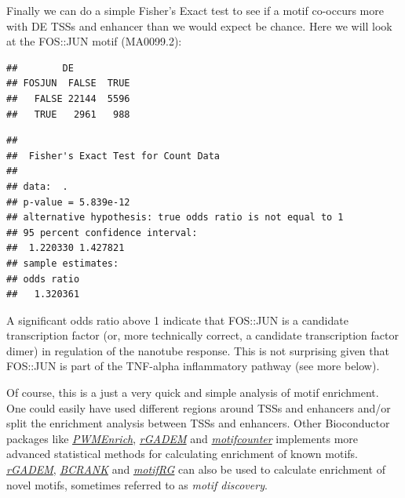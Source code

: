 \documentclass[9pt,a4paper,]{extarticle}
\newenvironment{Shaded}{\begin{snugshade}}{\end{snugshade}}
\newcommand{\KeywordTok}[1]{\textcolor[rgb]{0.13,0.29,0.53}{\textbf{{#1}}}}
\newcommand{\DataTypeTok}[1]{\textcolor[rgb]{0.13,0.29,0.53}{{#1}}}
\newcommand{\FloatTok}[1]{\textcolor[rgb]{0.00,0.00,0.81}{{#1}}}
\newcommand{\StringTok}[1]{\textcolor[rgb]{0.31,0.60,0.02}{{#1}}}
\newcommand{\CommentTok}[1]{\textcolor[rgb]{0.56,0.35,0.01}{\textit{{#1}}}}
\newcommand{\NormalTok}[1]{{#1}}
\begin{document}
Finally we can do a simple Fisher's Exact test to see if a motif co-occurs more with DE TSSs and enhancer than we would expect be chance. Here we will look at the FOS::JUN motif (MA0099.2):

\begin{Shaded}
\end{Shaded}

\begin{verbatim}
##        DE
## FOSJUN  FALSE  TRUE
##   FALSE 22144  5596
##   TRUE   2961   988
\end{verbatim}

\begin{verbatim}
## 
##  Fisher's Exact Test for Count Data
## 
## data:  .
## p-value = 5.839e-12
## alternative hypothesis: true odds ratio is not equal to 1
## 95 percent confidence interval:
##  1.220330 1.427821
## sample estimates:
## odds ratio 
##   1.320361
\end{verbatim}

A significant odds ratio above 1 indicate that FOS::JUN is a candidate transcription factor (or, more technically correct, a candidate transcription factor dimer) in regulation of the nanotube response. This is not surprising given that FOS::JUN is part of the TNF-alpha inflammatory pathway (see more below).

Of course, this is a just a very quick and simple analysis of motif enrichment. One could easily have used different regions around TSSs and enhancers and/or split the enrichment analysis between TSSs and enhancers. Other Bioconductor packages like \emph{\href{https://bioconductor.org/packages/3.8/PWMEnrich}{PWMEnrich}}, \emph{\href{https://bioconductor.org/packages/3.8/rGADEM}{rGADEM}} and \emph{\href{https://bioconductor.org/packages/3.8/motifcounter}{motifcounter}} implements more advanced statistical methods for calculating enrichment of known motifs. \emph{\href{https://bioconductor.org/packages/3.8/rGADEM}{rGADEM}}, \emph{\href{https://bioconductor.org/packages/3.8/BCRANK}{BCRANK}} and \emph{\href{https://bioconductor.org/packages/3.8/motifRG}{motifRG}} can also be used to calculate enrichment of novel motifs, sometimes referred to as \emph{motif discovery}.
\end{document}
